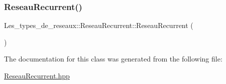 \subsubsection{\texorpdfstring{Reseau\+Recurrent()}{ReseauRecurrent()}}
{\footnotesize\ttfamily Les\+\_\+types\+\_\+de\+\_\+reseaux\+::\+Reseau\+Recurrent\+::\+Reseau\+Recurrent (\begin{DoxyParamCaption}{ }\end{DoxyParamCaption})}



The documentation for this class was generated from the following file\+:\begin{DoxyCompactItemize}
\item 
\hyperlink{_reseau_recurrent_8hpp}{Reseau\+Recurrent.\+hpp}\end{DoxyCompactItemize}
